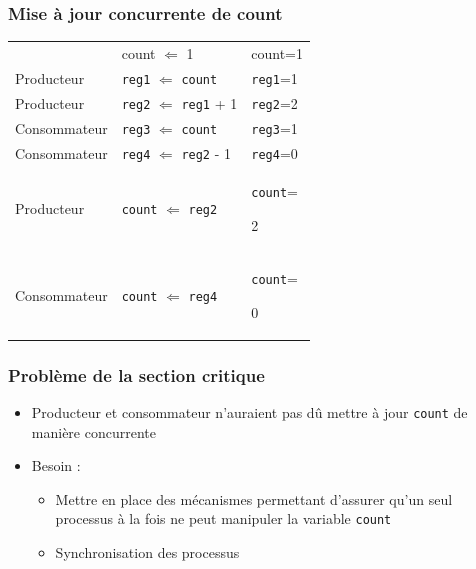 \begin{frame}
\frametitle{Mise à jour concurrente de count}
\begin{tabular}{lll}
&count $\Leftarrow$ 1 & count=1 \\ 
Producteur & \texttt{reg1} $\Leftarrow$ \texttt{count} & \texttt{reg1}=1 \\ 
Producteur & \texttt{reg2} $\Leftarrow$ \texttt{reg1} + 1 & \texttt{reg2}=2 \\ 
Consommateur & \texttt{reg3} $\Leftarrow$ \texttt{count} & \texttt{reg3}=1 \\ 
Consommateur & \texttt{reg4} $\Leftarrow$ \texttt{reg2} - 1 & \texttt{reg4}=0 \\ 
Producteur & \texttt{count} $\Leftarrow$ \texttt{reg2} & \texttt{count}=\begin{Huge}2\end{Huge} \\ 
Consommateur & \texttt{count} $\Leftarrow$ \texttt{reg4} & \texttt{count}=\begin{Huge}0\end{Huge} \\ 
\end{tabular} 
\end{frame}

\begin{frame}
\frametitle{Problème de la section critique}
\begin{itemize}
\item Producteur et consommateur n’auraient pas dû mettre à jour \texttt{count} de manière concurrente
\item Besoin : 
\begin{itemize}
\item Mettre en place des mécanismes permettant d’assurer qu’un seul processus à la fois ne peut manipuler la variable \texttt{count}
\item Synchronisation des processus
\end{itemize}
\end{itemize}
\end{frame}

